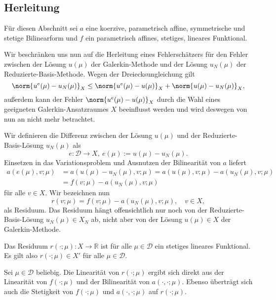 \subsection{Herleitung} %
\label{sub:herleitung}

Für diesen Abschnitt sei $a$ eine koerzive, parametrisch affine, symmetrische und stetige Bilinearform und $f$ ein parametrisch affines, stetiges, lineares Funktional.

Wir beschränken uns nun auf die Herleitung eines Fehlerschätzers für den Fehler zwischen der Lösung $u(\mu)$ der Galerkin-Methode und der Lösung $u_N(\mu)$ der Reduzierte-Basis-Methode. Wegen der Dreiecksungleichung gilt
\begin{equation}
    \norm{u^e(\mu) - u_N(\mu)}_X \leq \norm{u^e(\mu) - u(\mu)}_X + \norm{u(\mu) - u_N(\mu)}_X,
\end{equation}
außerdem kann der Fehler $\norm{u^e(\mu) - u(\mu)}_X$ durch die Wahl eines geeigneten Galerkin-Ansatzraumes $X$ beeinflusst werden und wird deswegen von nun an nicht mehr betrachtet.

Wir definieren die Differenz zwischen der Lösung $u(\mu)$ und der Reduzierte-Basis-Lösung $u_N(\mu)$ als
\begin{equation}
    \label{eq:fehler_fe_und_rb_lsg}
    e \colon \mathcal D \to X, ~
    e(\mu) := u(\mu) - u_N(\mu).
\end{equation}
Einsetzen in das Variationsproblem und Ausnutzen der Bilinearität von $a$ liefert
\begin{align}
    a(e(\mu), v; \mu)
    &= a(u(\mu) - u_N(\mu), v; \mu)
    = a(u(\mu), v; \mu) - a(u_N(\mu), v; \mu) \\
    &= f(v; \mu) - a(u_N(\mu), v; \mu)
\end{align}
für alle $v \in X$.
Wir bezeichnen nun
\begin{equation}
    \label{eq:def_residuum}
    r(v; \mu) = f(v; \mu) - a(u_N(\mu), v; \mu), \quad v \in X,
\end{equation}
als Residuum.
Das Residuum hängt offensichtlich nur noch von der Reduzierte-Basis-Lösung $u_N(\mu) \in X_N$ ab, nicht aber von der Lösung $u(\mu) \in X$ der Galerkin-Methode.

\begin{Lemma}
    Das Residuum $r(\cdot; \mu) \colon X \to \mathbb{R}$ ist für alle $\mu \in \mathcal D$ ein stetiges lineares Funktional. Es gilt also $r(\cdot; \mu) \in X'$ für alle $\mu \in \mathcal D$.

    \begin{Beweis}
    Sei $\mu \in \mathcal D$ beliebig.
    Die Linearität von $r(\cdot; \mu)$ ergibt sich direkt aus der Linearität von $f(\cdot; \mu)$ und der Bilinearität von $a(\cdot, \cdot; \mu)$.
    Ebenso überträgt sich auch die Stetigkeit von $f(\cdot; \mu)$ und $a(\cdot, \cdot; \mu)$ auf $r(\cdot; \mu)$.
    \end{Beweis}
\end{Lemma}


